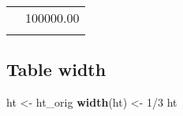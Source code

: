 \documentclass[]{article}
\newenvironment{Shaded}{\begin{snugshade}}{\end{snugshade}}
\newcommand{\KeywordTok}[1]{\textcolor[rgb]{0.13,0.29,0.53}{\textbf{{#1}}}}
\newcommand{\DecValTok}[1]{\textcolor[rgb]{0.00,0.00,0.81}{{#1}}}
\newcommand{\StringTok}[1]{\textcolor[rgb]{0.31,0.60,0.02}{{#1}}}
\newcommand{\NormalTok}[1]{{#1}}
\begin{document}
\begin{table}[h]
\begin{raggedright}
\begin{tabularx}{0.5\textwidth}{p{} p{}}
\hhline{>{\arrayrulecolor{black}}|>{\arrayrulecolor{black}}->{\arrayrulecolor{black}}|>{\arrayrulecolor{black}}-}
\arrayrulecolor{black}
\multicolumn{1}{|p{0.25\textwidth}|}{\raggedright\rule{0pt}{\baselineskip+4pt}\hspace*{4pt}Thyme\hspace*{4pt}\rule[-4pt]{0pt}{4pt}} & \multicolumn{1}{p{0.25\textwidth}|}{\raggedright\rule{0pt}{\baselineskip+4pt}\hspace*{4pt}100000.00\hspace*{4pt}\rule[-4pt]{0pt}{4pt}} \tabularnewline[-0.5pt]
\hhline{>{\arrayrulecolor{black}}|>{\arrayrulecolor{black}}->{\arrayrulecolor{black}}|>{\arrayrulecolor{black}}-}
\arrayrulecolor{black}
\end{tabularx}
\par\end{raggedright}
\end{table}

\FloatBarrier

\subsection{Table width}\label{table-width}

\begin{Shaded}
\begin{Highlighting}[]
\NormalTok{ht <-}\StringTok{ }\NormalTok{ht_orig}
\KeywordTok{width}\NormalTok{(ht) <-}\StringTok{ }\DecValTok{1}\NormalTok{/}\DecValTok{3}
\NormalTok{ht}
\end{Highlighting}
\end{Shaded}
\end{document}
